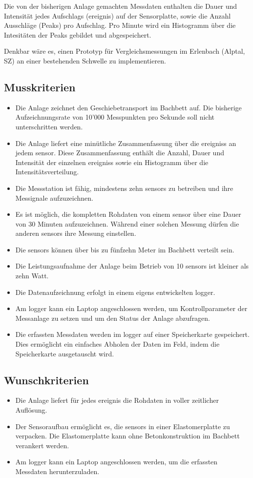 Die von der bisherigen Anlage gemachten Messdaten enthalten die Dauer und Intensität jedes Aufschlags (\gls{ereignis}) auf der Sensorplatte, sowie die Anzahl Ausschläge (Peaks) pro Aufschlag. Pro Minute wird ein Histogramm über die Intesitäten der Peaks gebildet und abgespeichert.

Denkbar wäre es, einen Prototyp für Vergleichsmessungen im Erlenbach (Alptal, SZ) an einer bestehenden Schwelle zu implementieren.


\subsection{Musskriterien}
\begin{itemize}
\item Die Anlage zeichnet den Geschiebetransport im Bachbett auf. Die bisherige Aufzeichnungsrate von 10'000 Messpunkten pro Sekunde soll nicht unterschritten werden.
\item Die Anlage liefert eine minütliche Zusammenfassung über die \glspl{ereignis} an jedem \gls{sensor}. Diese Zusammenfassung enthält die Anzahl, Dauer und Intensität der einzelnen \glspl{ereignis} sowie ein Histogramm über die Intensitätsverteilung.
\item Die Messstation ist fähig, mindestens zehn \glspl{sensor} zu betreiben und ihre Messignale aufzuzeichnen.
\item Es ist möglich, die kompletten Rohdaten von einem \gls{sensor} über eine Dauer von 30 Minuten aufzuzeichnen. Während einer solchen Messung dürfen die anderen \glspl{sensor} ihre Messung einstellen.
\item Die \glspl{sensor} können über bis zu fünfzehn Meter im Bachbett verteilt sein.
\item Die Leistungsaufnahme der Anlage beim Betrieb von 10 \glspl{sensor} ist kleiner als zehn Watt.
\item Die Datenaufzeichnung erfolgt in einem eigens entwickelten \gls{logger}.
\item Am \gls{logger} kann ein Laptop angeschlossen werden, um Kontrollparameter der Messanlage zu setzen und um den Status der Anlage abzufragen.
\item Die erfassten Messdaten werden im \gls{logger} auf einer Speicherkarte gespeichert. Dies ermöglicht ein einfaches Abholen der Daten im Feld, indem die Speicherkarte ausgetauscht wird.
\end{itemize}
\subsection{Wunschkriterien}
\begin{itemize}
\item Die Anlage liefert für jedes \gls{ereignis} die Rohdaten in voller zeitlicher Auflösung.
\item Der Sensoraufbau ermöglicht es, die \glspl{sensor} in einer Elastomerplatte zu verpacken. Die Elastomerplatte kann ohne Betonkonstruktion im Bachbett verankert werden.
\item Am \gls{logger} kann ein Laptop angeschlossen werden, um die erfassten Messdaten herunterzuladen.
\end{itemize}

